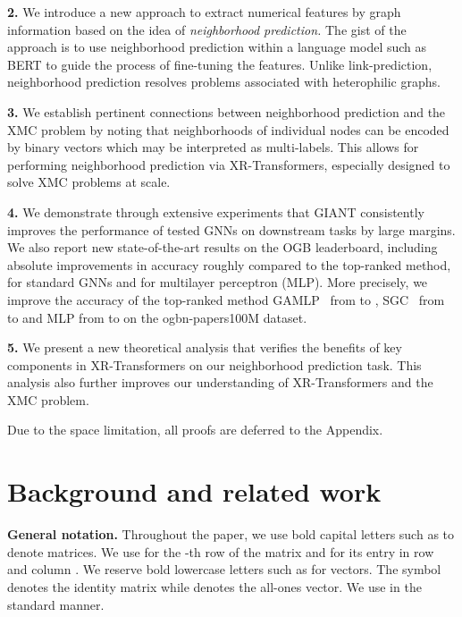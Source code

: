\documentclass{article} \usepackage{iclr2022_conference,times}
\begin{document}
\textbf{2.} We introduce a new approach to extract numerical features by graph information based on the idea of \emph{neighborhood prediction.} The gist of the approach is to use neighborhood prediction within a language model such as BERT to guide the process of fine-tuning the features. Unlike link-prediction, neighborhood prediction resolves problems associated with heterophilic graphs.

\textbf{3.} We establish pertinent connections between neighborhood prediction and the XMC problem by noting that neighborhoods of individual nodes can be encoded by binary vectors which may be interpreted as multi-labels. This allows for performing neighborhood prediction via XR-Transformers, especially designed to solve XMC problems at scale.

\textbf{4.} We demonstrate through extensive experiments that GIANT consistently improves the performance of tested GNNs on downstream tasks by large margins. We also report new state-of-the-art results on the OGB leaderboard, including absolute improvements in accuracy roughly  compared to the top-ranked method,  for standard GNNs and  for multilayer perceptron (MLP). More precisely, we improve the accuracy of the top-ranked method GAMLP~\citep{zhang2021graph} from  to , SGC~\citep{wu2019simplifying} from  to  and MLP from  to  on the ogbn-papers100M dataset. 

\textbf{5.} We present a new theoretical analysis that verifies the benefits of key components in XR-Transformers on our neighborhood prediction task. This analysis also further improves our understanding of XR-Transformers and the XMC problem.

Due to the space limitation, all proofs are deferred to the Appendix.

\vspace{-0.3cm}
\section{Background and related work}
\textbf{General notation. }Throughout the paper, we use bold capital letters such as  to denote matrices. We use  for the -th row of the matrix and  for its entry in row  and column . We reserve bold lowercase letters such as  for vectors. The symbol  denotes the identity matrix while  denotes the all-ones vector. We use  in the standard manner.
\end{document}
